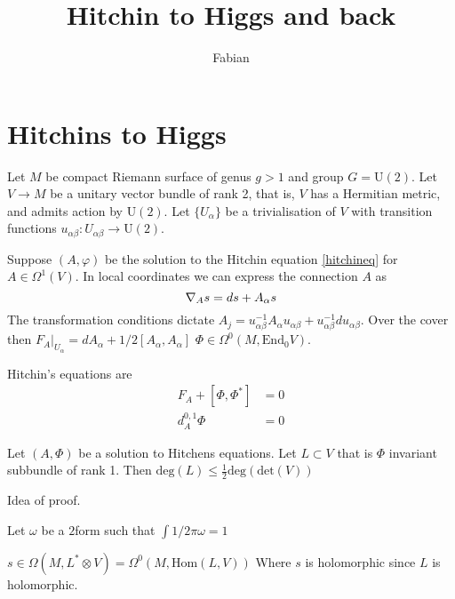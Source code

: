 % 


\title{Hitchin to Higgs and back}
\author{Fabian}
\date{}

 
\maketitle
\Large

\section{Hitchins to Higgs} %

Let $M$ be compact Riemann surface of genus $g > 1$ and group $ G  = \mathrm{U}(2) $.
Let $ V \rightarrow M $ be a unitary vector bundle of rank 2, that is, $V$ has a Hermitian metric, and admits action by $\mathrm{U}(2)$.
Let $\{U_{\alpha} \} $ be a trivialisation of $V$ with transition functions 
$ u_{\alpha \beta} : U_{\alpha \beta} \rightarrow  \mathrm{U}(2) $. 

Suppose $ (A, \varphi) $ be the solution to the Hitchin equation \ref{hitchineq} for $A \in \Omega^1(V)$.
In local coordinates we can express the connection $A$ as 
\begin{equation}
    \nabla _{ A} s = ds + A_{\alpha} s \\
\end{equation}
The transformation conditions dictate $ A_j = u_{\alpha \beta} ^{-1} A_{\alpha} u_{\alpha \beta}  +  u_{\alpha \beta} ^{-1} d u_{\alpha \beta}$. 
Over the cover then $ F_A |_{U_{\alpha} }  = d A_{\alpha} + 1/2 [A_{\alpha} , A_{\alpha}] $
$ \Phi \in \Omega ^0 (M , \mathrm{End}_0 V) $.


Hitchin's equations are
\begin{align}
    F_A + [ \Phi , \Phi^* ] &=0 \\
    d_A ^{0,1} \Phi &= 0 
\end{align}

\begin{theorem}
    Let $( A,  \Phi ) $ be a solution to Hitchens equations. 
    Let $ L \subset V $ that is $ \Phi $ invariant subbundle of rank 1. 
    Then $ \mathrm{deg} (L ) \leq \frac{1}{2} \mathrm{deg} ( \mathrm{det} ( V) ) $ 
\end{theorem}

Idea of proof. 

Let $\omega $ be a $2$form such that 
$ \int 1/2 \pi \omega  = 1$ 

$ s \in \Omega( M, L^* \otimes V ) = \Omega ^0 ( M , \mathrm{Hom}(L, V) ) $ 
Where $s$ is holomorphic since $L$ is holomorphic. 

